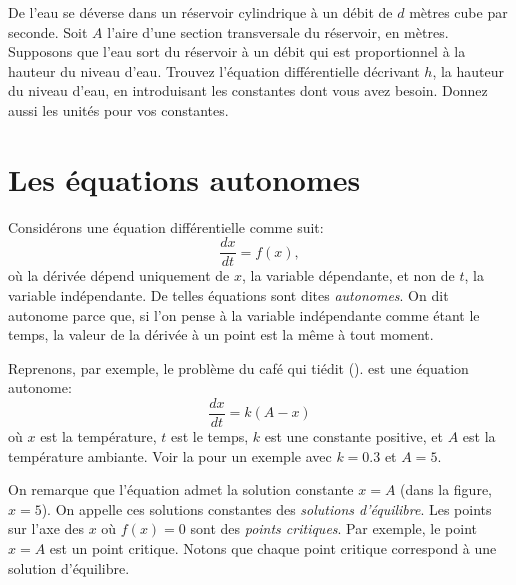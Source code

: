 \begin{exercise}
	De l'eau se déverse dans un réservoir cylindrique à un débit de $d$ mètres cube par seconde.
	Soit $A$ l'aire d'une section transversale du réservoir, en mètres.
	Supposons que l'eau sort du réservoir à un débit qui est proportionnel à la hauteur du niveau d'eau.
	Trouvez l'équation différentielle décrivant $h$, la hauteur du niveau d'eau, en introduisant les constantes dont vous avez besoin.
	Donnez aussi les unités pour vos constantes.
\end{exercise}



\sectionnewpage
\section{Les équations autonomes}
\label{auteq:section}


Considérons une équation différentielle comme suit:
\begin{equation*}
	\frac{dx}{dt} = f(x),
\end{equation*}
où la dérivée dépend uniquement de $x$, la variable dépendante, et non de $t$, la variable indépendante.
De telles équations sont dites \emph{autonomes}.
On dit \og{}autonome\fg{} parce que, si l'on pense à la variable indépendante comme étant le temps, la valeur de la dérivée à un point est la même à tout moment.

Reprenons, par exemple, le problème du café qui tiédit ().
 est une équation autonome:
\begin{equation*}
	\frac{dx}{dt} = k (A-x)
\end{equation*}
où $x$ est la température, $t$ est le temps, $k$ est une constante positive,
et $A$ est la température ambiante.
 Voir la  pour un exemple avec $k=0.3$ et $A=5$.

On remarque que l'équation admet la solution constante $x=A$ (dans la figure, $x=5$).
On appelle ces solutions constantes des \emph{solutions d'équilibre}.
Les points sur l'axe des $x$ où $f(x) = 0$ sont des \emph{points critiques}.
Par exemple, le point  $x=A$ est un point critique. Notons que chaque point critique correspond à une solution d'équilibre.

